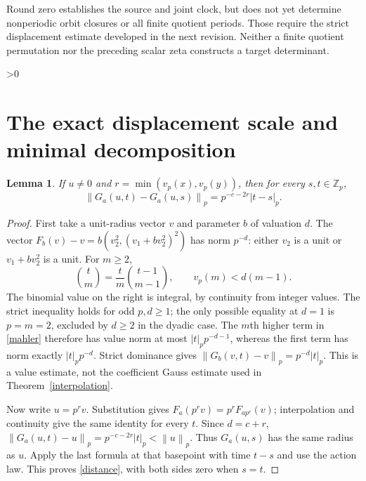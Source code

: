 \documentclass[10pt]{article}
\newtheorem{lemma}{Lemma}
\newcommand{\Zp}{\mathbb Z_p}
\newcommand{\norm}[1]{\left\|#1\right\|_p}
\begin{document}
Round zero establishes the source and joint clock, but does not yet
determine nonperiodic orbit closures or all finite quotient periods.
Those require the strict displacement estimate developed in the next
revision. Neither a finite quotient permutation nor the preceding scalar
zeta constructs a target determinant.
\fi

\ifnum\CRevisionRound>0
\section{The exact displacement scale and minimal decomposition}
\begin{lemma}\label{strict}
If $u\ne0$ and $r=\min(v_p(x),v_p(y))$, then for every $s,t\in\Zp$,
\begin{equation}\label{distance}
 \norm{G_a(u,t)-G_a(u,s)}=p^{-c-2r}|t-s|_p.
\end{equation}
\end{lemma}
\begin{proof}
First take a unit-radius vector $v$ and parameter $b$ of valuation $d$.
The vector $F_b(v)-v=b(v_2^2,(v_1+bv_2^2)^2)$ has norm $p^{-d}$:
either $v_2$ is a unit or $v_1+bv_2^2$ is a unit.
For $m\ge2$,
\[
 \binom tm=\frac{t}{m}\binom{t-1}{m-1},\qquad
 v_p(m)<d(m-1).
\]
The binomial value on the right is integral, by continuity from integer
values. The strict inequality holds for odd $p,d\ge1$; the only possible
equality at $d=1$ is $p=m=2$, excluded by $d\ge2$ in the dyadic case.
The $m$th higher term in \eqref{mahler} therefore has value norm at most
$|t|_p p^{-d-1}$, whereas the first term has norm exactly $|t|_p p^{-d}$.
Strict dominance gives $\norm{G_b(v,t)-v}=p^{-d}|t|_p$.
This is a value estimate, not the coefficient Gauss estimate used in
Theorem~\ref{interpolation}.

Now write $u=p^rv$. Substitution gives
$F_a(p^rv)=p^rF_{ap^r}(v)$; interpolation and continuity give the same
identity for every $t$. Since $d=c+r$,
$\norm{G_a(u,t)-u}=p^{-c-2r}|t|_p<\norm u$.
Thus $G_a(u,s)$ has the same radius as $u$. Apply the last formula at
that basepoint with time $t-s$ and use the action law. This proves
\eqref{distance}, with both sides zero when $s=t$.
\end{proof}
\end{document}
